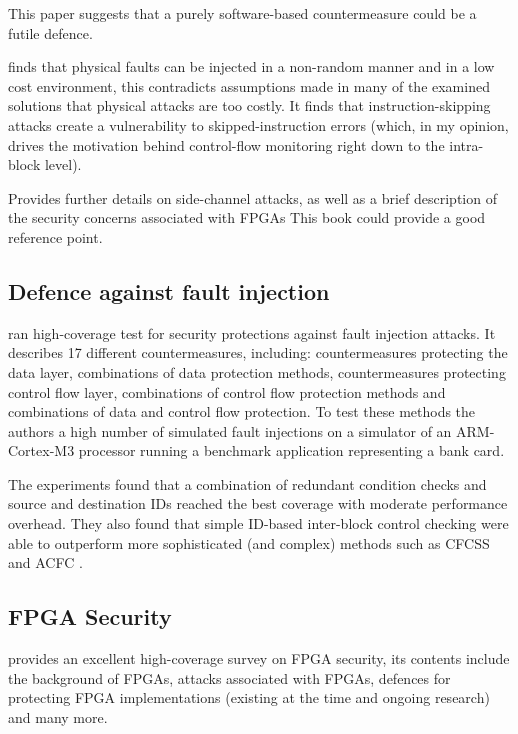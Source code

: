 This paper suggests that a purely software-based countermeasure could be a futile defence.

\cite{Kelly2017} finds that physical faults can be injected in a non-random manner and in a low cost environment, this contradicts assumptions made in many of the examined solutions that physical attacks are too costly. It finds that instruction-skipping attacks create a vulnerability to skipped-instruction errors (which, in my opinion, drives the motivation behind control-flow monitoring right down to the intra-block level).

\cite{GebotysCatherineH2010Sied} Provides further details on side-channel attacks, as well as a brief description of the security concerns associated with FPGAs This book could provide a good reference point.

\subsection{Defence against fault injection}

\cite{Theissing2013} ran high-coverage test for security protections against fault injection attacks. It describes 17 different countermeasures, including: countermeasures protecting the data layer, combinations of data protection methods, countermeasures protecting control flow layer, combinations of control flow protection methods and combinations of data and control flow protection. To test these methods the authors a high number of simulated fault injections on a simulator of an ARM-Cortex-M3 processor running a benchmark application representing a bank card.

The experiments found that a combination of redundant condition checks  and source and destination IDs reached the best coverage with moderate performance overhead. They also found that simple ID-based inter-block control checking were able to outperform more sophisticated (and complex) methods such as CFCSS   and ACFC  .

\subsection{FPGA Security}

\cite{Drimer2008} provides an excellent high-coverage survey on FPGA security, its contents include the background of FPGAs, attacks associated with FPGAs, defences for protecting FPGA implementations (existing at the time and ongoing research) and many more. 

